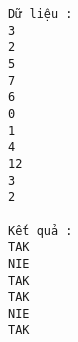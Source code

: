 \begin{verbatim}
Dữ liệu :
3
2
5
7
6
0
1
4
12
3
2

Kết quả :
TAK
NIE
TAK
TAK
NIE
TAK



\end{verbatim}